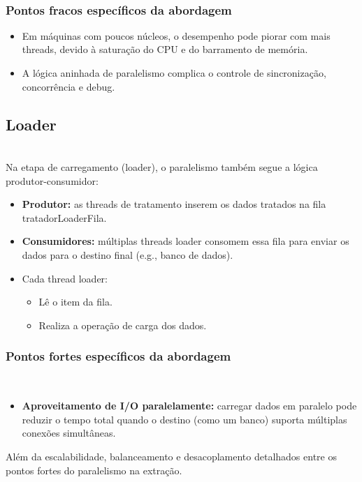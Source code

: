 \documentclass[a4paper,12pt]{article}
\begin{document}
\vspace{1em}

\\
\subsubsection*{Pontos fracos específicos da abordagem}

\begin{itemize}
    \item Em máquinas com poucos núcleos, o desempenho pode piorar com mais threads, devido à saturação do CPU e do barramento de memória. 
    \item A lógica aninhada de paralelismo complica o controle de sincronização, concorrência e debug.

\end{itemize}


\subsection*{Loader}
\\
Na etapa de carregamento (loader), o paralelismo também segue a lógica produtor-consumidor:

\begin{itemize}
    \item \textbf{Produtor:} as threads de tratamento inserem os dados tratados na fila tratadorLoaderFila.

    \item \textbf{Consumidores:} múltiplas threads loader consomem essa fila para enviar os dados para o destino final (e.g., banco de dados).

    \item Cada thread loader:
    \begin{itemize}
        \item Lê o item da fila.
        \item Realiza a operação de carga dos dados.
    \end{itemize}
\end{itemize}


\subsubsection*{Pontos fortes específicos da abordagem}
\\
\begin{itemize}
    \item \textbf{Aproveitamento de I/O paralelamente:} carregar dados em paralelo pode reduzir o tempo total quando o destino (como um banco) suporta múltiplas conexões simultâneas.
    
\end{itemize}
Além da escalabilidade, balanceamento e desacoplamento detalhados entre os pontos fortes do paralelismo na extração.
\end{document}

